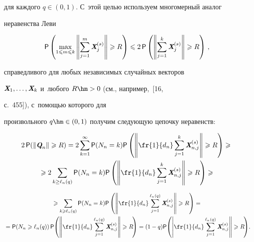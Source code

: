 для каждого $q\in(0,1)$. С~этой целью используем многомерный аналог


неравенства Леви


$$


{\sf P}\left(\max\limits_{1\leqslant m\leqslant


k}\left\|\sum\limits_{j=1}^m\vX_j^{(s)}\right\|\geqslant R\right)\leqslant2\,{\sf


P}\left(\left\|\sum\limits_{j=1}^k\vX_j^{(s)}\right\|\geqslant R\right)\,,


$$


справедливого для любых независимых случайных векторов


$\emph{\textbf{X}}_1,\ldots ,\emph{\textbf{X}}_k$ и~любого $R\hm>0$ (см., например,~[16,


с.~455]), с~помощью которого для


произвольного $q\hm\in(0,1)$ получим следующую цепочку неравенств:


\begin{multline*}


2\,{\sf P}(\|\vQ_n\|\geqslant R)=2\sum\limits_{k=1}^{\infty}{\sf


P}(N_n=k){\sf


P}\left(\left\|\fr{1}{d_n}\sum\limits_{j=1}^k\vX_{n,j}^{(s)}\right\|\geqslant


R\right)\geqslant{}


\\


{}\geqslant 2\sum\limits_{k\ge\ell_n(q)}{\sf P}(N_n=k){\sf


P}\left(\left\|\fr{1}{d_n}\sum\limits_{j=1}^k\vX_{n,j}^{(s)}\right\|\geqslant


R\right)\geqslant{}


\end{multline*}





\noindent


\begin{multline*}


{}\geqslant


\sum\limits_{k\geqslant\ell_n(q)}{\sf P}(N_n=k){\sf


P}\left(\left\|\fr{1}{d_n}\sum\limits_{j=1}^{\ell_n(q)}\vX_{n,j}^{(s)}


\right\|\geqslant


R\right)={}


\\


{}={\sf P}\!\left(N_n\geqslant\ell_n(q)\right){\sf


P}\!\left(\left\|\fr{1}{d_n}\sum\limits_{j=1}^{\ell_n(q)}\vX_{n,j}^{(s)}


\right\|\geqslant R\!\right)=


(1-q){\sf


P}\!\left(\left|\fr{1}{d_n}\sum\limits_{j=1}^{\ell_n(q)}\vX_{n,j}^{(s)}\right\|\geqslant


R\!\right)\!.\hspace*{-0.93689pt}


\end{multline*}


